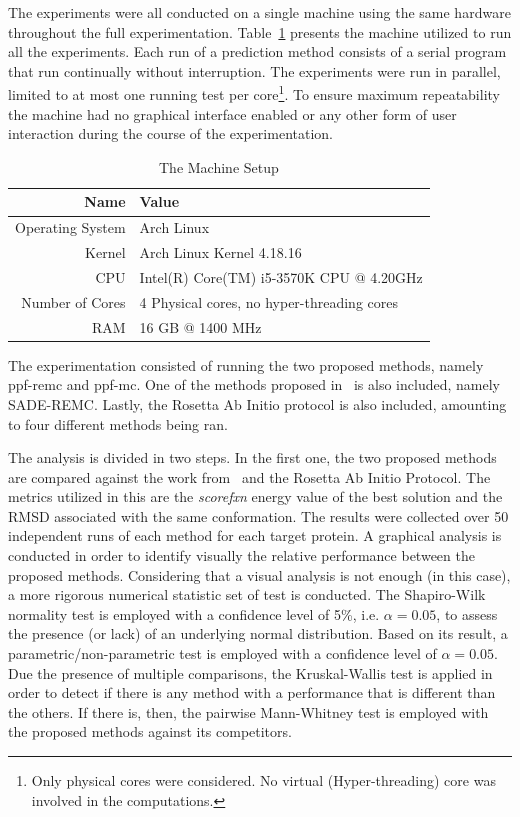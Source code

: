 The experiments were all conducted on a single machine using the same hardware
throughout the full experimentation. Table~\ref{tab:machine-setup}
presents the machine utilized to run all the experiments. Each run of a
prediction method consists of a serial program that run continually without
interruption. The experiments were run in parallel, limited to at most one
running test per core\footnote{Only physical cores were considered. No virtual
(Hyper-threading) core was involved in the computations.}. To ensure maximum
repeatability the machine had no graphical interface enabled or any other form
of user interaction during the course of the experimentation.

\begin{table}[th]
    \centering
    \begin{tabular}{r|l} \hline \hline
        Name & Value \\ \hline \hline
        Operating System & Arch Linux \\ \hline
        Kernel &  Arch Linux Kernel 4.18.16 \\ \hline
        CPU & Intel(R) Core(TM) i5-3570K CPU @ 4.20GHz \\ \hline
        Number of Cores & 4 Physical cores, no hyper-threading cores \\ \hline
        RAM & 16 GB @ 1400 MHz \\ \hline \hline
    \end{tabular}
    \caption{The Machine Setup}
    \label{tab:machine-setup}
\end{table}

The experimentation consisted of running the two proposed methods, namely
ppf-remc and ppf-mc. One of the methods proposed
in~\cite{silva2019self} is also included, namely SADE-REMC.
Lastly, the Rosetta Ab Initio protocol is also included, amounting to four
different methods being ran.

The analysis is divided in two steps. In the first one, the two proposed methods
are compared against the work from~ and the Rosetta Ab Initio
Protocol.
The metrics utilized in this are the \textit{scorefxn} energy value of the
best solution and the \ac{RMSD} associated with the same conformation. The
results were collected over 50 independent runs of each method for each target
protein. A graphical analysis is conducted in order to identify visually the
relative performance between the proposed methods. Considering that a visual
analysis is not enough (in this case), a more rigorous numerical statistic set
of test is conducted. The Shapiro-Wilk~\cite{wilk1968joint} normality test is
employed with a confidence level of 5\%, i.e. $\alpha = 0.05$, to assess the
presence (or lack) of an underlying normal distribution. Based on its result, a
parametric/non-parametric test is employed with a confidence level of $\alpha =
0.05$. Due the presence of multiple comparisons, the Kruskal-Wallis test is
applied in order to detect if there is any method with a performance that
is different than the others. If there is, then, the pairwise Mann-Whitney test is
employed with the proposed methods against its competitors.

